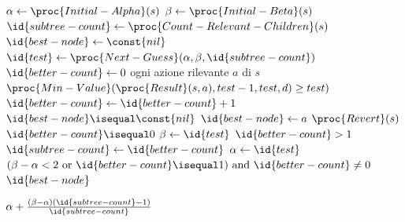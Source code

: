 \documentclass{article}
\begin{document}
\begin{codebox}
  \li  $\alpha \gets \proc{Initial-Alpha}(s)$ \label{li:initial-alpha}
  \li  $\beta \gets \proc{Initial-Beta}(s)$ \label{li:initial-beta}
  \li  $\id{subtree-count} \gets \proc{Count-Relevant-Children}(s)$
  \li  \Repeat
  \li    $\id{best-node} \gets \const{nil}$
  \li    $\id{test} \gets \proc{Next-Guess}(\alpha, \beta, \id{subtree-count})$
  \li    $\id{better-count} \gets 0$
  \li    \For ogni azione rilevante $a$ di $s$
  \li      \Do
             \If $\proc{Min-Value}(\proc{Result}(s, a), test - 1, test, d) \geq
             test)$ \label{li:min-value}
  \li          \Then
                 $\id{better-count} \gets \id{better-count} + 1$
  \li            \If $\id{best-node} \isequal \const{nil}$
  \li              \Then
                     $\id{best-node} \gets a$
                   \End
               \End
  \li        $\proc{Revert}(s)$ \label{li:backtracking}
           \End
  \li    \If $\id{better-count} \isequal 0$
  \li      \Then $\beta \gets \id{test}$
  \li    \ElseIf $\id{better-count} > 1$
  \li      \Then
             $\id{subtree-count} \gets \id{better-count}$
  \li        $\alpha \gets \id{test}$
           \End
  \li  \Until $(\beta - \alpha < 2 \mbox{ or } \id{better-count} \isequal 1)
       \mbox{ and } \id{better-count} \neq 0$
  \li  \Return $\id{best-node}$
\end{codebox}

\begin{codebox}
  \li  \Return $\alpha + \frac{(\beta - \alpha) (\id{subtree-count} - 1)}
       {\id{subtree-count}}$
\end{codebox}
\end{document}
